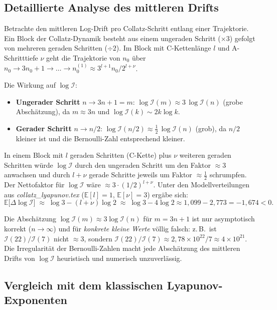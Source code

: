 \documentclass[12pt,a4paper]{article}
\newcommand{\E}{\mathbb{E}}
\newcommand{\In}{\mathcal{I}}      %
\begin{document}
\subsection{Detaillierte Analyse des mittleren Drifts}

Betrachte den mittleren Log-Drift pro Collatz-Schritt entlang einer Trajektorie.
Ein Block der Collatz-Dynamik besteht aus einem ungeraden Schritt ($\times 3$)
gefolgt von mehreren geraden Schritten ($\div 2$). Im Block mit C-Kettenlänge $l$
und A-Schritttiefe $\nu$ geht die Trajektorie von $n_0$ über $n_0 \to 3n_0+1
\to \ldots \to n_0^{(1)} \approx 3^{l+1}n_0/2^{l+\nu}$.

Die Wirkung auf $\log\In$:
\begin{itemize}[noitemsep]
  \item \textbf{Ungerader Schritt} $n \to 3n+1 = m$: $\log\In(m) \approx 3\,\log\In(n)$
    (grobe Abschätzung), da $m \approx 3n$ und $\log\In(k) \sim 2k\log k$.
  \item \textbf{Gerader Schritt} $n \to n/2$: $\log\In(n/2) \approx \tfrac{1}{2}\,\log\In(n)$
    (grob), da $n/2$ kleiner ist und die Bernoulli-Zahl entsprechend kleiner.
\end{itemize}
In einem Block mit $l$ geraden Schritten (C-Kette) plus $\nu$ weiteren geraden Schritten
würde $\log\In$ durch den ungeraden Schritt um den Faktor $\approx 3$ anwachsen
und durch $l+\nu$ gerade Schritte jeweils um Faktor $\approx \tfrac{1}{2}$ schrumpfen.
Der Nettofaktor für $\log\In$ wäre $\approx 3 \cdot (1/2)^{l+\nu}$.
Unter den Modellverteilungen aus \textit{collatz\_lyapunov.tex}
($\E[l] = 1$, $\E[\nu] = 3$) ergäbe sich:
\[
  \E\!\bigl[\Delta\log\In\bigr] \;\approx\; \log 3 - (l+\nu)\log 2
  \;\approx\; \log 3 - 4\log 2 \approx 1{,}099 - 2{,}773 = -1{,}674 < 0.
\]

\begin{tcolorbox}[warnung, title={Warum diese Rechnung trügerisch ist}]
Die Abschätzung $\log\In(m) \approx 3\log\In(n)$ für $m = 3n+1$ ist nur
asymptotisch korrekt ($n \to \infty$) und für \emph{konkrete kleine Werte}
völlig falsch: z.\,B.\ ist $\In(22)/\In(7)$ nicht $\approx 3$, sondern
$\In(22)/\In(7) \approx 2{,}78 \times 10^{22}/7 \approx 4 \times 10^{21}$.
Die Irregularität der Bernoulli-Zahlen macht jede Abschätzung des mittleren
Drifts von $\log\In$ heuristisch und numerisch unzuverlässig.
\end{tcolorbox}

\subsection{Vergleich mit dem klassischen Lyapunov-Exponenten}
\end{document}
